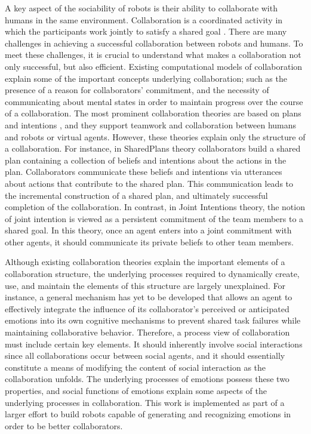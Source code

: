 A key aspect of the sociability of robots is their ability to collaborate with
humans in the same environment. Collaboration is a coordinated activity in which
the participants work jointly to satisfy a shared goal
\cite{grosz:plans-discourse}. There are many challenges in achieving a
successful collaboration between robots and humans. To meet these challenges, it
is crucial to understand what makes a collaboration not only successful, but
also efficient. Existing computational models of collaboration explain some of
the important concepts underlying collaboration; such as the presence of a
reason for collaborators' commitment, and the necessity of communicating about
mental states in order to maintain progress over the course of a collaboration.
The most prominent collaboration theories are based on plans and intentions
\cite{cohen:teamwork} \cite{grosz:plans-discourse}, and they support teamwork
and collaboration between humans and robots or virtual agents. However, these
theories explain only the structure of a collaboration. For instance, in
SharedPlans theory collaborators build a shared plan containing a collection of
beliefs and intentions about the actions in the plan. Collaborators communicate
these beliefs and intentions via utterances about actions that contribute to the
shared plan. This communication leads to the incremental construction of a
shared plan, and ultimately successful completion of the collaboration. In
contrast, in Joint Intentions theory, the notion of joint intention is viewed as
a persistent commitment of the team members to a shared goal. In this theory,
once an agent enters into a joint commitment with other agents, it should
communicate its private beliefs to other team members.

Although existing collaboration theories explain the important elements of a
collaboration structure, the underlying processes required to dynamically
create, use, and maintain the elements of this structure are largely
unexplained. For instance, a general mechanism has yet to be developed that
allows an agent to effectively integrate the influence of its collaborator's
perceived or anticipated emotions into its own cognitive mechanisms to prevent
shared task failures while maintaining collaborative behavior. Therefore, a
process view of collaboration must include certain key elements. It should
inherently involve social interactions since all collaborations occur between
social agents, and it should essentially constitute a means of modifying the
content of social interaction as the collaboration unfolds. The underlying
processes of emotions possess these two properties, and social functions of
emotions explain some aspects of the underlying processes in collaboration.
This work is implemented as part of a larger effort to build robots capable of
generating and recognizing emotions in order to be better collaborators.

